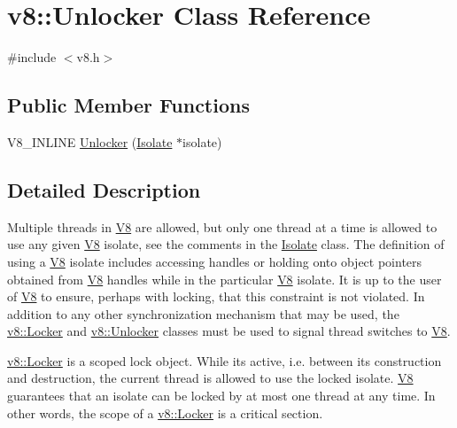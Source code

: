\hypertarget{classv8_1_1Unlocker}{}\section{v8\+:\+:Unlocker Class Reference}
\label{classv8_1_1Unlocker}


{\ttfamily \#include $<$v8.\+h$>$}

\subsection*{Public Member Functions}
\begin{DoxyCompactItemize}
\item 
V8\+\_\+\+I\+N\+L\+I\+NE \mbox{\hyperlink{classv8_1_1Unlocker_a2faeb117d7308b65ac85fdad390e4c1f}{Unlocker}} (\mbox{\hyperlink{classv8_1_1Isolate}{Isolate}} $\ast$isolate)
\end{DoxyCompactItemize}


\subsection{Detailed Description}
Multiple threads in \mbox{\hyperlink{classv8_1_1V8}{V8}} are allowed, but only one thread at a time is allowed to use any given \mbox{\hyperlink{classv8_1_1V8}{V8}} isolate, see the comments in the \mbox{\hyperlink{classv8_1_1Isolate}{Isolate}} class. The definition of \textquotesingle{}using a \mbox{\hyperlink{classv8_1_1V8}{V8}} isolate\textquotesingle{} includes accessing handles or holding onto object pointers obtained from \mbox{\hyperlink{classv8_1_1V8}{V8}} handles while in the particular \mbox{\hyperlink{classv8_1_1V8}{V8}} isolate. It is up to the user of \mbox{\hyperlink{classv8_1_1V8}{V8}} to ensure, perhaps with locking, that this constraint is not violated. In addition to any other synchronization mechanism that may be used, the \mbox{\hyperlink{classv8_1_1Locker}{v8\+::\+Locker}} and \mbox{\hyperlink{classv8_1_1Unlocker}{v8\+::\+Unlocker}} classes must be used to signal thread switches to \mbox{\hyperlink{classv8_1_1V8}{V8}}.

\mbox{\hyperlink{classv8_1_1Locker}{v8\+::\+Locker}} is a scoped lock object. While it\textquotesingle{}s active, i.\+e. between its construction and destruction, the current thread is allowed to use the locked isolate. \mbox{\hyperlink{classv8_1_1V8}{V8}} guarantees that an isolate can be locked by at most one thread at any time. In other words, the scope of a \mbox{\hyperlink{classv8_1_1Locker}{v8\+::\+Locker}} is a critical section.

